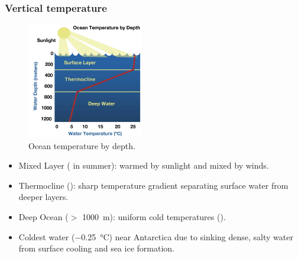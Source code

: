\subsubsection{Vertical temperature}
\begin{figure}
	\centering
	\includegraphics[width=0.45\textwidth]{figs/ocean-temp-vertical-profile}
	\caption{Ocean temperature by depth.}
	\label{fig:ocean-temp-vertical-profile}
\end{figure}

\begin{itemize}
	\item Mixed Layer ( in summer):
	      warmed by sunlight and mixed by winds.
	\item Thermocline ():
	      sharp temperature gradient separating surface water from deeper layers.
	\item Deep Ocean ($>$ \qty{1000}{\meter}):
	      uniform cold temperatures ().
	\item Coldest water (\qty{-0.25}{\celsius}) near Antarctica due to sinking dense, salty water from surface cooling and sea ice formation.
\end{itemize}

